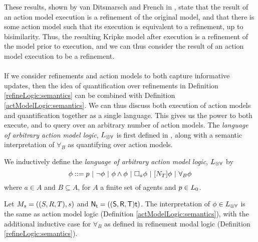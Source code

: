 These results, shown by van Ditsmarsch and French in \cite{van2009simulation}, state that the result
of an action model execution is a refinement of the original model, and that there is some action
model such that its execution is equivalent to a refinement, up to bisimilarity.
Thus, the resulting Kripke model after execution is a refinement of the model prior to
execution, and we can thus consider the result of an action model execution to be a refinement.\\
\\
If we consider refinements and action models to both capture informative updates,
then the idea of quantification over refinements in Definition \ref{refineLogic:semantics} can be
combined with Definition \ref{actModelLogic:semantics}.
We can thus discuss both execution of action models and quantification together as a single language.
This gives us the power to both execute, and to query over an arbitrary number of action models.
The {\em language of arbitrary action model logic}, $L_{\otimes\forall}$ is first defined in
\cite{hales13synthesis}, along with a semantic interpretation of $\forall_B$ as quantifying over
action models.

\begin{defn} \label{arbActLogic:syntax}
	We inductively define the {\em language of arbitrary action model logic}, $L_{\otimes\forall}$ by
\[
	\phi ::= p \text{ } | \text{ } \neg \phi \text{ } | \text{ } \phi \land \phi \text{ } | \text{ } \Box_a \phi \text{ } |
  \text{ }[{N_T}] \phi \text{ } | \text{ } \forall_B \phi
\]
where $a \in A$ and $B \subseteq A$, for $A$ a finite set of agents and $p \in L_0$.
\end{defn}

\begin{defn} \label{arbActLogic:semantics}
	Let $M_s = ((S,R,T),s)$ and $\mathrm{\mathsf{N}}_\mathrm{\mathsf{t}} = ((\mathrm{\mathsf{S}},\mathrm{\mathsf{R}},\mathrm{\mathsf{T}})\mathrm{\mathsf{t}})$.
	The interpretation of $\phi \in L_{\otimes\forall}$ is the same as action model logic (Definition
	\ref{actModelLogic:semantics}), with the additional inductive case for $\forall_B$ as defined in
	refinement modal logic (Definition \ref{refineLogic:semantics}).
\end{defn}

